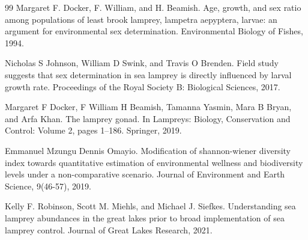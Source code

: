 \documentclass[11pt,a4paper]{ctexart}
\begin{document}
\begin{thebibliography}{99}
 Margaret F. Docker, F. William, and H. Beamish. Age, growth, and sex ratio among populations of least brook lamprey, lampetra aepyptera, larvae: an argument for environmental sex determination. Environmental Biology of Fishes, 1994.

 Nicholas S Johnson, William D Swink, and Travis O Brenden. Field study suggests that sex determination in sea lamprey is directly influenced by larval growth rate. Proceedings of the Royal Society B: Biological Sciences, 2017.

 Margaret F Docker, F William H Beamish, Tamanna Yasmin, Mara B Bryan, and Arfa Khan. The lamprey gonad. In Lampreys: Biology, Conservation and Control: Volume 2, pages 1--186. Springer, 2019.

 Emmanuel Mzungu Dennis Omayio. Modification of shannon-wiener diversity index towards quantitative estimation of environmental wellness and biodiversity levels under a non-comparative scenario. Journal of Environment and Earth Science, 9(46-57), 2019.

 Kelly F. Robinson, Scott M. Miehls, and Michael J. Siefkes. Understanding sea lamprey abundances in the great lakes prior to broad implementation of sea lamprey control. Journal of Great Lakes Research, 2021.

\end{thebibliography}
\end{document}
